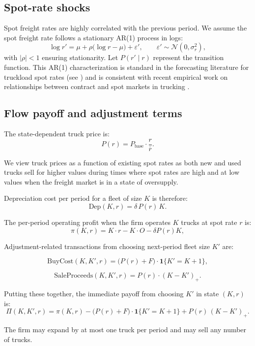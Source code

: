 \documentclass[12pt]{article}
\begin{document}
	\subsection{Spot-rate shocks}
	
	\indent Spot freight rates are highly correlated with the previous period. We assume the spot freight rate follows a stationary AR(1) process in logs:
	\begin{equation}
		\log r' = \mu + \rho\big(\log r - \mu\big) + \varepsilon',
		\qquad \varepsilon' \sim \mathcal{N}(0,\sigma_r^2),
	\end{equation}
	with $|\rho|<1$ ensuring stationarity. Let $P(r' \mid r)$ represent the transition function. This AR(1) characterization is standard in the forecasting literature for truckload spot rates (see \citealt{miller2018arima}) and is consistent with recent empirical work on relationships between contract and spot markets in trucking \citep{harris2023long}.
	
	\subsection{Flow payoff and adjustment terms}
	
	\indent The state-dependent truck price is:
	\[
	P(r) = P_{\text{base}} \cdot \frac{r}{\bar r}.
	\]
	
	We view truck prices as a function of existing spot rates as both new and used trucks sell for higher values during times where spot rates are high and at low values when the freight market is in a state of oversupply.
	
	Depreciation cost per period for a fleet of size $K$ is therefore:
	\[
	\text{Dep}(K,r) = \delta \, P(r)\, K.
	\]
	
	\indent The per-period operating profit when the firm operates $K$ trucks at spot rate $r$ is:
	\[
	\pi(K,r) 
	= K \cdot r 
	- K \cdot O
	- \delta P(r) K,
	\]
	
	Adjustment-related transactions from choosing next-period fleet size $K'$ are:
	
	\[
	\text{BuyCost}(K,K',r) 
	= \big(P(r) + F\big)\cdot \mathbf{1}\{K'=K+1\},
	\]
	
	\[
	\text{SaleProceeds}(K,K',r) 
	= P(r)\cdot (K-K')_+.
	\]
	
	Putting these together, the immediate payoff from choosing $K'$ in state $(K,r)$ is:
	\[
	\Pi(K,K',r)
	=
	\pi(K,r)
	- \big(P(r)+F\big)\cdot \mathbf{1}\{K'=K+1\}
	+ P(r)\,(K-K')_+.
	\]
	
	The firm may expand by at most one truck per period and may sell any number of trucks.
	
\end{document}
